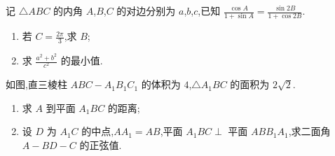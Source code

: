 \begin{problem}
记 \(\triangle ABC\) 的内角 \(A\),\(B\),\(C\) 的对边分别为 \(a\),\(b\),\(c\),已知 \(\frac{\cos A}{1+\sin A}=\frac{\sin 2B}{1+\cos 2B}\).

\begin{enumerate}
\item 若 \(C=\frac{2\pi}{3}\),求 \(B\);

\item 求 \(\frac{a^2+b^2}{c^2}\) 的最小值.
\end{enumerate}
\end{problem}

\begin{problem}
如图,直三棱柱 \(ABC-A_1B_1C_1\) 的体积为 \(4\),\(\triangle A_1BC\) 的面积为 \(2\sqrt2\).

\begin{enumerate}
\item 求 \(A\) 到平面 \(A_1BC\) 的距离;

\item 设 \(D\) 为 \(A_1C\) 的中点,\(AA_1=AB\),平面 \(A_1BC\perp\) 平面 \(ABB_1A_1\),求二面角 \(A-BD-C\) 的正弦值.
\end{enumerate}

\end{problem}

